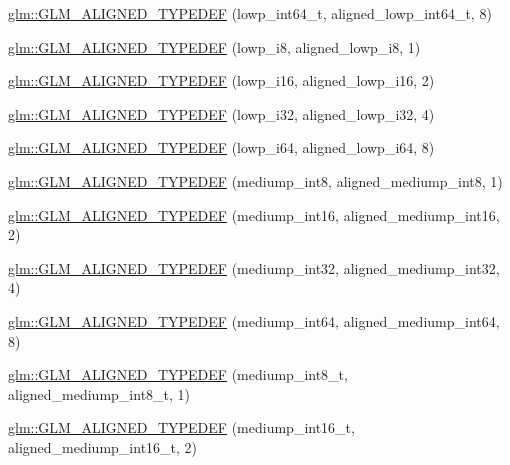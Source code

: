 \begin{DoxyCompactItemize}
\hyperlink{group__gtx__type__aligned_ga7ccb60f3215d293fd62b33b31ed0e7be}{glm\-::\-G\-L\-M\-\_\-\-A\-L\-I\-G\-N\-E\-D\-\_\-\-T\-Y\-P\-E\-D\-E\-F} (lowp\-\_\-int64\-\_\-t, aligned\-\_\-lowp\-\_\-int64\-\_\-t, 8)
\item 
\hyperlink{group__gtx__type__aligned_gac20d508d2ef5cc95ad3daf083c57ec2a}{glm\-::\-G\-L\-M\-\_\-\-A\-L\-I\-G\-N\-E\-D\-\_\-\-T\-Y\-P\-E\-D\-E\-F} (lowp\-\_\-i8, aligned\-\_\-lowp\-\_\-i8, 1)
\item 
\hyperlink{group__gtx__type__aligned_ga50257b48069a31d0c8d9c1f644d267de}{glm\-::\-G\-L\-M\-\_\-\-A\-L\-I\-G\-N\-E\-D\-\_\-\-T\-Y\-P\-E\-D\-E\-F} (lowp\-\_\-i16, aligned\-\_\-lowp\-\_\-i16, 2)
\item 
\hyperlink{group__gtx__type__aligned_gaa07e98e67b7a3435c0746018c7a2a839}{glm\-::\-G\-L\-M\-\_\-\-A\-L\-I\-G\-N\-E\-D\-\_\-\-T\-Y\-P\-E\-D\-E\-F} (lowp\-\_\-i32, aligned\-\_\-lowp\-\_\-i32, 4)
\item 
\hyperlink{group__gtx__type__aligned_ga62601fc6f8ca298b77285bedf03faffd}{glm\-::\-G\-L\-M\-\_\-\-A\-L\-I\-G\-N\-E\-D\-\_\-\-T\-Y\-P\-E\-D\-E\-F} (lowp\-\_\-i64, aligned\-\_\-lowp\-\_\-i64, 8)
\item 
\hyperlink{group__gtx__type__aligned_gac8cff825951aeb54dd846037113c72db}{glm\-::\-G\-L\-M\-\_\-\-A\-L\-I\-G\-N\-E\-D\-\_\-\-T\-Y\-P\-E\-D\-E\-F} (mediump\-\_\-int8, aligned\-\_\-mediump\-\_\-int8, 1)
\item 
\hyperlink{group__gtx__type__aligned_ga78f443d88f438575a62b5df497cdf66b}{glm\-::\-G\-L\-M\-\_\-\-A\-L\-I\-G\-N\-E\-D\-\_\-\-T\-Y\-P\-E\-D\-E\-F} (mediump\-\_\-int16, aligned\-\_\-mediump\-\_\-int16, 2)
\item 
\hyperlink{group__gtx__type__aligned_ga0680cd3b5d4e8006985fb41a4f9b57af}{glm\-::\-G\-L\-M\-\_\-\-A\-L\-I\-G\-N\-E\-D\-\_\-\-T\-Y\-P\-E\-D\-E\-F} (mediump\-\_\-int32, aligned\-\_\-mediump\-\_\-int32, 4)
\item 
\hyperlink{group__gtx__type__aligned_gad9e5babb1dd3e3531b42c37bf25dd951}{glm\-::\-G\-L\-M\-\_\-\-A\-L\-I\-G\-N\-E\-D\-\_\-\-T\-Y\-P\-E\-D\-E\-F} (mediump\-\_\-int64, aligned\-\_\-mediump\-\_\-int64, 8)
\item 
\hyperlink{group__gtx__type__aligned_ga353fd9fa8a9ad952fcabd0d53ad9a6dd}{glm\-::\-G\-L\-M\-\_\-\-A\-L\-I\-G\-N\-E\-D\-\_\-\-T\-Y\-P\-E\-D\-E\-F} (mediump\-\_\-int8\-\_\-t, aligned\-\_\-mediump\-\_\-int8\-\_\-t, 1)
\item 
\hyperlink{group__gtx__type__aligned_ga2196442c0e5c5e8c77842de388c42521}{glm\-::\-G\-L\-M\-\_\-\-A\-L\-I\-G\-N\-E\-D\-\_\-\-T\-Y\-P\-E\-D\-E\-F} (mediump\-\_\-int16\-\_\-t, aligned\-\_\-mediump\-\_\-int16\-\_\-t, 2)

\end{DoxyCompactItemize}
